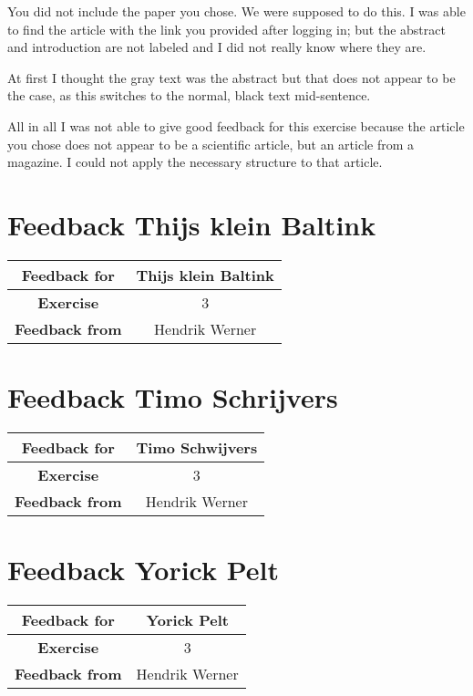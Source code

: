 \documentclass[12pt, a4paper]{article}
\begin{document}
You did not include the paper you chose. We were supposed to do this. I was able to find the article with the link you provided after logging in; but the abstract and introduction are not labeled and I did not really know where they are.

At first I thought the gray text was the abstract but that does not appear to be the case, as this switches to the normal, black text mid-sentence.

All in all I was not able to give good feedback for this exercise because the article you chose does not appear to be a scientific article, but an article from a magazine. I could not apply the necessary structure to that article.

\clearpage
\section{Feedback Thijs klein Baltink}
\begin{tabular}{|c|c|}
	\hline
	\textbf{Feedback for} & Thijs klein Baltink\\\hline
	\textbf{Exercise} & 3\\\hline
	\textbf{Feedback from} & Hendrik Werner\\\hline
\end{tabular}

\clearpage
\section{Feedback Timo Schrijvers}
\begin{tabular}{|c|c|}
	\hline
	\textbf{Feedback for} & Timo Schwijvers\\\hline
	\textbf{Exercise} & 3\\\hline
	\textbf{Feedback from} & Hendrik Werner\\\hline
\end{tabular}

\clearpage
\section{Feedback Yorick Pelt}
\begin{tabular}{|c|c|}
	\hline
	\textbf{Feedback for} & Yorick Pelt\\\hline
	\textbf{Exercise} & 3\\\hline
	\textbf{Feedback from} & Hendrik Werner\\\hline
\end{tabular}
\end{document}
